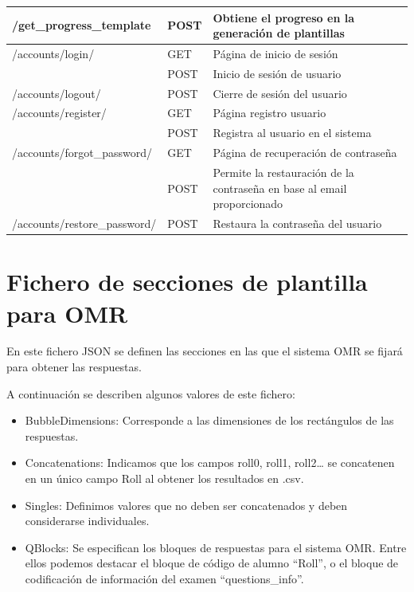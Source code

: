 \documentclass[a4paper, 12pt]{book}
\begin{document}
\begin{longtable}{ | p{5cm} | p{2cm} | p{7cm} |}
  \hline
  \centering /get\_progress\_template & \centering POST & \centering Obtiene el progreso en la generación de plantillas \tabularnewline

  \hline
  \centering \multirow{2}{*} {/accounts/login/}
  & \centering GET & \centering Página de inicio de sesión \tabularnewline
  \cline{2-3}
  & \centering POST & \centering Inicio de sesión de usuario \tabularnewline

  \hline
  \centering /accounts/logout/ & \centering POST & \centering Cierre de sesión del usuario \tabularnewline

  \hline
  \centering \multirow{2}{*} {/accounts/register/}
  & \centering GET & \centering Página registro usuario \tabularnewline
  \cline{2-3}
  & \centering POST & \centering Registra al usuario en el sistema \tabularnewline

  \hline
  \centering \multirow{2}{*} {/accounts/forgot\_password/}
  & \centering GET & \centering Página de recuperación de contraseña \tabularnewline
  \cline{2-3}
  & \centering POST & \centering Permite la restauración de la contraseña en base al email proporcionado \tabularnewline

  \hline
  \centering /accounts/restore\_password/ & \centering POST & \centering Restaura la contraseña del usuario \tabularnewline
\end{longtable}

\chapter{Fichero de secciones de plantilla para OMR}
\label{app:template_json}

En este fichero JSON se definen las secciones en las que el sistema OMR
se fijará para obtener las respuestas.

A continuación se describen algunos valores de este fichero:

\begin{itemize}
  \item BubbleDimensions: Corresponde a las dimensiones de los rectángulos
  de las respuestas.
  \item Concatenations: Indicamos que los campos roll0, roll1, roll2\dots
  se concatenen en un único campo Roll al obtener los resultados en .csv.
  \item Singles: Definimos valores que no deben ser concatenados y deben
  considerarse individuales.
  \item QBlocks: Se especifican los bloques de respuestas para el sistema OMR.
  Entre ellos podemos destacar el bloque de código de alumno ``Roll'', o el
  bloque de codificación de información del examen ``questions\_info''.
\end{itemize}
\end{document}
